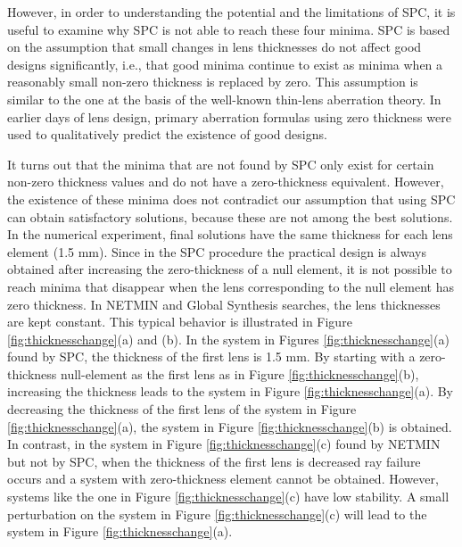 However, in order to understanding the potential and the limitations of SPC, it is useful to examine why SPC is not able to reach these four minima. SPC is based on the assumption that small changes in lens thicknesses do not affect good designs significantly, i.e., that good minima continue to exist as minima when a reasonably small non-zero thickness is replaced by zero. This assumption is similar to the one at the basis of the well-known thin-lens aberration theory. In earlier days of lens design, primary aberration formulas using zero thickness were used to qualitatively predict the existence of good designs.

It turns out that the minima that are not found by SPC only exist for certain non-zero thickness values and do not have a zero-thickness equivalent. However, the existence of these minima does not contradict our assumption that using SPC can obtain satisfactory solutions, because these are not among the best solutions. In the numerical experiment, final solutions have the same thickness for each lens element (1.5 mm). Since in the SPC procedure the practical design is always obtained after increasing the zero-thickness of a null element, it is not possible to reach minima that disappear when the lens corresponding to the null element has zero thickness. In NETMIN and Global Synthesis searches, the lens thicknesses are kept constant. This typical behavior is illustrated in Figure \ref{fig:thicknesschange}(a) and (b). In the system in Figures \ref{fig:thicknesschange}(a) found by SPC, the thickness of the first lens is 1.5 mm. By starting with a zero-thickness null-element as the first lens as in Figure \ref{fig:thicknesschange}(b), increasing the thickness leads to the system in Figure \ref{fig:thicknesschange}(a). By decreasing the thickness of the first lens of the system in Figure \ref{fig:thicknesschange}(a), the system in Figure \ref{fig:thicknesschange}(b) is obtained. In contrast, in the system in Figure \ref{fig:thicknesschange}(c) found by NETMIN but not by SPC, when the thickness of the first lens is decreased ray failure occurs and a system with zero-thickness element cannot be obtained. However, systems like the one in Figure \ref{fig:thicknesschange}(c) have low stability. A small perturbation on the system in Figure \ref{fig:thicknesschange}(c) will lead to the system in Figure \ref{fig:thicknesschange}(a).

